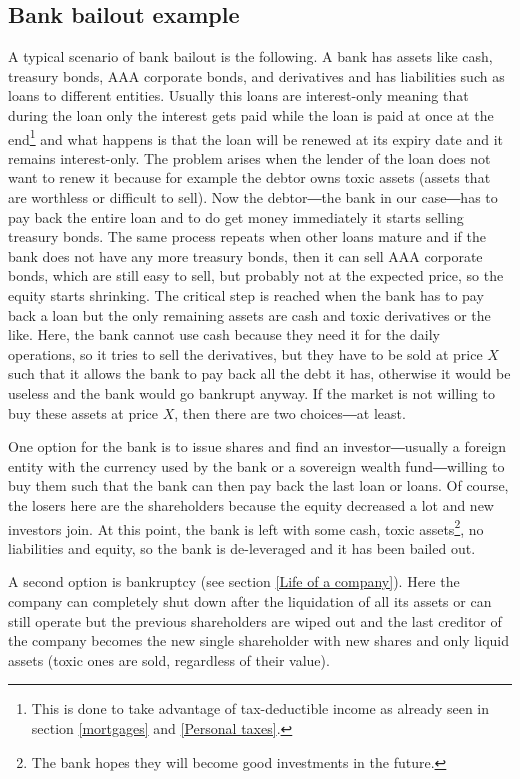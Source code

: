 \subsection{Bank bailout example}
A typical scenario of bank bailout is the following. A bank has assets like cash, treasury bonds, AAA corporate bonds, and derivatives and has liabilities such as loans to different entities. Usually this loans are interest-only meaning that during the loan only the interest gets paid while the loan is paid at once at the end\footnote{This is done to take advantage of tax-deductible income as already seen in section \ref{mortgages} and \ref{Personal taxes}.} and what happens is that the loan will be renewed at its expiry date and it remains interest-only. The problem arises when the lender of the loan does not want to renew it because for example the debtor owns toxic assets (assets that are worthless or difficult to sell). Now the debtor―the bank in our case―has to pay back the entire loan and to do get money immediately it starts selling treasury bonds. The same process repeats when other loans mature and if the bank does not have any more treasury bonds, then it can sell AAA corporate bonds, which are still easy to sell, but probably not at the expected price, so the equity starts shrinking. The critical step is reached when the bank has to pay back a loan but the only remaining assets are cash and toxic derivatives or the like. Here, the bank cannot use cash because they need it for the daily operations, so it tries to sell the derivatives, but they have to be sold at price $X$ such that it allows the bank to pay back all the debt it has, otherwise it would be useless and the bank would go bankrupt anyway. If the market is not willing to buy these assets at price $X$, then there are two choices―at least.

One option for the bank is to issue shares and find an investor―usually a foreign entity with the currency used by the bank or a sovereign wealth fund―willing to buy them such that the bank can then pay back the last loan or loans. Of course, the losers here are the shareholders because the equity decreased a lot and new investors join. At this point, the bank is left with some cash, toxic assets\footnote{The bank hopes they will become good investments in the future.}, no liabilities and equity, so the bank is de-leveraged and it has been bailed out.

A second option is bankruptcy (see section \ref{Life of a company}). Here the company can completely shut down after the liquidation of all its assets or can still operate but the previous shareholders are wiped out and the last creditor of the company becomes the new single shareholder with new shares and only liquid assets (toxic ones are sold, regardless of their value).

